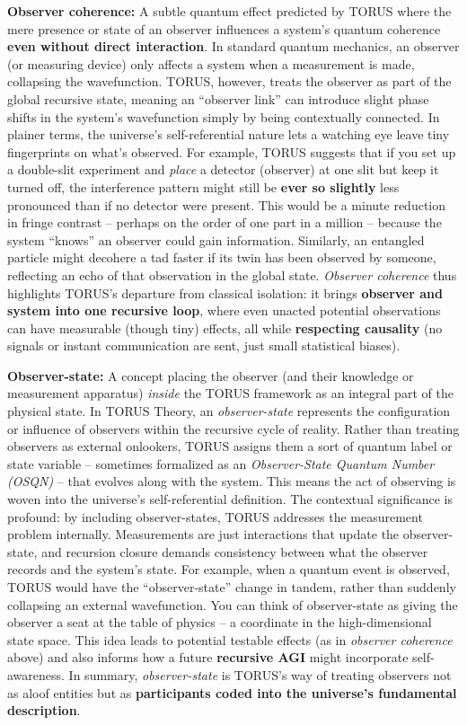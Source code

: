 \documentclass[]{article}
\begin{document}
{\textbf{Observer coherence:} A subtle quantum effect predicted by TORUS
where the mere presence or state of an observer influences a system's
quantum coherence \textbf{even without direct interaction}​. In standard
quantum mechanics, an observer (or measuring device) only affects a
system when a measurement is made, collapsing the wavefunction. TORUS,
however, treats the observer as part of the global recursive state,
meaning an ``observer link'' can introduce slight phase shifts in the
system's wavefunction simply by being contextually connected​. In
plainer terms, the universe's self-referential nature lets a watching
eye leave tiny fingerprints on what's observed. For example, TORUS
suggests that if you set up a double-slit experiment and \emph{place} a
detector (observer) at one slit but keep it turned off, the interference
pattern might still be \textbf{ever so slightly} less pronounced than if
no detector were present​. This would be a minute reduction in fringe
contrast -- perhaps on the order of one part in a million -- because the
system ``knows'' an observer could gain information​. Similarly, an
entangled particle might decohere a tad faster if its twin has been
observed by someone, reflecting an echo of that observation in the
global state. \emph{Observer coherence} thus highlights TORUS's
departure from classical isolation: it brings \textbf{observer and
system into one recursive loop}, where even unacted potential
observations can have measurable (though tiny) effects, all while
\textbf{respecting causality} (no signals or instant communication are
sent, just small statistical biases).

\textbf{Observer-state:} A concept placing the observer (and their
knowledge or measurement apparatus) \emph{inside} the TORUS framework as
an integral part of the physical state. In TORUS Theory, an
\emph{observer-state} represents the configuration or influence of
observers within the recursive cycle of reality​. Rather than treating
observers as external onlookers, TORUS assigns them a sort of quantum
label or state variable -- sometimes formalized as an
\emph{Observer-State Quantum Number (OSQN)} -- that evolves along with
the system​. This means the act of observing is woven into the
universe's self-referential definition. The contextual significance is
profound: by including observer-states, TORUS addresses the measurement
problem internally. Measurements are just interactions that update the
observer-state, and recursion closure demands consistency between what
the observer records and the system's state​. For example, when a
quantum event is observed, TORUS would have the ``observer-state''
change in tandem, rather than suddenly collapsing an external
wavefunction. You can think of observer-state as giving the observer a
seat at the table of physics -- a coordinate in the high-dimensional
state space. This idea leads to potential testable effects (as in
\emph{observer coherence} above) and also informs how a future
\textbf{recursive AGI} might incorporate self-awareness. In summary,
\emph{observer-state} is TORUS's way of treating observers not as aloof
entities but as \textbf{participants coded into the universe's
fundamental description}.

}
\end{document}
